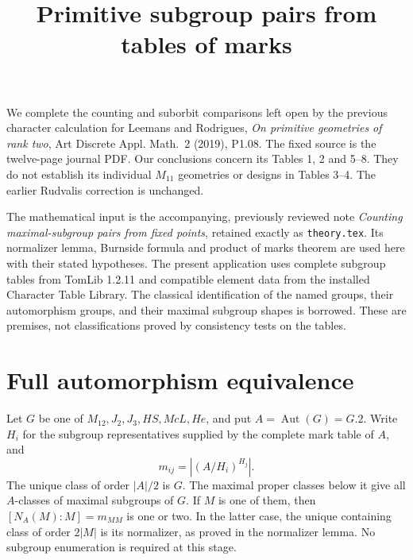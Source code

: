 \documentclass[11pt]{article}
\title{Primitive subgroup pairs from tables of marks}
\author{}
\date{}
\newcommand{\Aut}{\operatorname{Aut}}
\begin{document}
\maketitle
We complete the counting and suborbit comparisons left open by the previous
character calculation for Leemans and Rodrigues, \emph{On primitive geometries
of rank two}, Art Discrete Appl. Math.\ 2 (2019), P1.08. The fixed source is
the twelve-page journal PDF. Our conclusions concern its Tables 1, 2 and
5--8. They do not establish its individual $M_{11}$ geometries or designs
in Tables 3--4. The earlier Rudvalis correction is unchanged.

The mathematical input is the accompanying, previously reviewed note
\emph{Counting maximal-subgroup pairs from fixed points}, retained exactly
as \texttt{theory.tex}. Its normalizer lemma, Burnside formula and product
of marks theorem are used here with their stated hypotheses. The present
application uses complete subgroup tables from TomLib 1.2.11 and compatible
element data from the installed Character Table Library. The classical
identification of the named groups, their automorphism groups, and their
maximal subgroup shapes is borrowed. These are premises, not classifications
proved by consistency tests on the tables.

\section{Full automorphism equivalence}
Let $G$ be one of $M_{12},J_2,J_3,HS,McL,He$, and put $A=\Aut(G)=G.2$.
Write $H_i$ for the subgroup representatives supplied by the complete mark
table of $A$, and
\[
                 m_{ij}=|(A/H_i)^{H_j}|.
\]
The unique class of order $|A|/2$ is $G$. The maximal proper classes below
it give all $A$-classes of maximal subgroups of $G$. If $M$ is one of them,
then $[N_A(M):M]=m_{MM}$ is one or two. In the latter case, the unique
containing class of order $2|M|$ is its normalizer, as proved in the
normalizer lemma. No subgroup enumeration is required at this stage.
\end{document}
